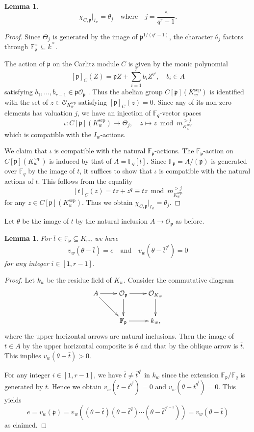 \documentclass[10pt]{amsart}
\theoremstyle{plain}
\newtheorem{lem}[thm]{Lemma}
\theoremstyle{definition}
\newcommand{\sep}{\mathrm{sep}}
\newcommand{\cO}{\mathcal{O}}
\newcommand{\bF}{\mathbb{F}}
\newcommand{\frp}{\mathfrak{p}}
\begin{document}
\begin{lem}\label{LemCarlitzTameChar}
	\[
	\chi_{C,\frp}|_{I_w}=\theta_j\quad\text{where}\quad j=\frac{e}{q^r-1}.
	\]
\end{lem}
\begin{proof}
	Since $\Theta_j$ is generated by the image of ${\frp}^{1/(q^r-1)}$, the character $\theta_j$ factors through $\bF_\frp^\times\subseteq \bar{k}^\times$.

	
	The action of $\frp$ on the Carlitz module $C$ is given by the monic polynomial
	\[
	[\frp]_C(Z)=\frp Z+\sum_{i=1}^r b_i Z^{q^i},\quad b_i\in A
	\]
	satisfying $b_1,\ldots,b_{r-1}\in \frp\cO_\frp$ \cite[Proposition 2.4]{Hayes}. 
	Thus the abelian group $C[\frp](K_w^\sep)$
	is identified with the set of $z\in \cO_{K_w^\sep}$ satisfying $[\frp]_C(z)=0$. Since any of its non-zero elements has valuation $j$,
	we have an injection of $\bF_q$-vector spaces
	\[
	\iota: C[\frp](K_w^\sep)\to \Theta_j,\quad z\mapsto z\bmod m_{K_w^\sep}^{>j}
	\]
	which is compatible with the $I_w$-actions.
	
	We claim that $\iota$ is compatible with the natural $\bF_\frp$-actions. The $\bF_\frp$-action on $C[\frp](K_w^\sep)$ is induced by
	that of $A=\bF_q[t]$. Since $\bF_\frp=A/(\frp)$ is generated over $\bF_q$ by the image of $t$, it suffices to show that $\iota$ is compatible with the 
	natural actions of $t$. This follows from the equality
	\[
	[t]_C(z)=tz+z^q\equiv tz \bmod m_{K_w^\sep}^{>j}
	\]
	for any $z\in C[\frp](K^\sep_w)$. Thus we obtain $\chi_{C,\frp}|_{I_w}=\theta_j$.
\end{proof}

Let $\theta$ be the image of $t$ by the natural inclusion $A\to \cO_\frp$ as before.

\begin{lem}\label{LemPFactorKw}
	For $\bar{t}\in \bF_\frp\subseteq K_w$, we have
	\[
	v_w(\theta-\bar{t})=e\quad\text{and}\quad v_w(\theta-\bar{t}^{q^i})=0
	\]
	for any integer $i\in [1,r-1]$.
\end{lem}
\begin{proof}
	Let $k_w$ be the residue field of $K_w$.
	Consider the commutative diagram
	\[
	\xymatrix{
		A \ar[r]\ar[rd] & \cO_\frp \ar[r]\ar[d]& \cO_{K_w} \ar[d]\\
		& \bF_\frp \ar[r]& k_w,
	}
	\]
	where the upper horizontal arrows are natural inclusions.
	Then the image of $t\in A$ by the upper horizontal composite is $\theta$ and that by the oblique arrow is $\bar{t}$.
	This implies $v_w(\theta-\bar{t})>0$. 
	
	For any integer $i\in [1,r-1]$, we have $\bar{t}\neq \bar{t}^{q^i}$ in $k_w$ since the extension $\bF_\frp/\bF_q$ is generated by $\bar{t}$.
	Hence we obtain $v_w(\bar{t}-\bar{t}^{q^i})=0$ and $v_w(\theta-\bar{t}^{q^i})=0$. This yields
	\[
	e=v_w(\frp)=v_w((\theta-\bar{t})(\theta-\bar{t}^q)\cdots (\theta-\bar{t}^{q^{r-1}}))=v_w(\theta-\bar{t})
	\]
	as claimed.
\end{proof}
\end{document}
